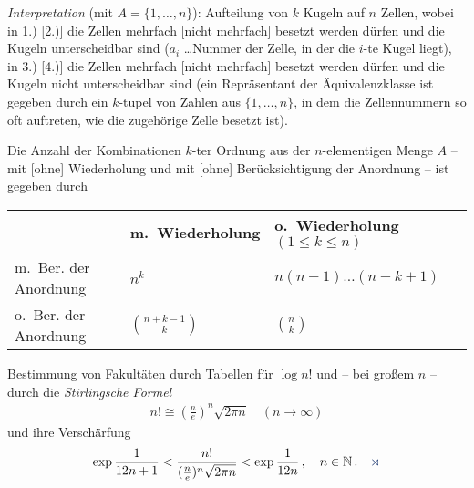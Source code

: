 \textit{Interpretation} (mit $A= \{1,\ldots ,n\}$): Aufteilung von $k$
Kugeln auf $n$ Zellen, wobei in 1.) [2.)] die Zellen mehrfach [nicht mehrfach]
besetzt werden dürfen und die Kugeln unterscheidbar sind ($a_{i}$ \ldots Nummer der Zelle, in
der die $i$-te Kugel liegt), in 3.) [4.)] die Zellen mehrfach [nicht mehrfach]
besetzt werden dürfen und die Kugeln nicht unterscheidbar sind (ein Repräsentant
der Äquivalenzklasse ist gegeben durch ein $k$-tupel von Zahlen aus
$\{1, \ldots , n\}$, in dem die Zellennummern so oft auftreten, wie die
zugehörige Zelle besetzt ist).\\

\begin{prop}
\label{prop:2.3}
Die Anzahl der Kombinationen $k$-ter Ordnung aus der
$n$-elementigen Menge $A$ -- mit [ohne] Wiederholung und mit [ohne]
Berücksichtigung der Anordnung -- ist gegeben durch

\vspace{0.2cm}
\begin{tabular}{l|l|l}
 & m.\ Wiederholung & o.\ Wiederholung $(1 \leq k \leq n )$ \\ \hline
 m.\ Ber. der Anordnung & $n^{k}$ & $n(n-1) \ldots (n-k+1)$ \\
 \hline
 o.\ Ber. der Anordnung & ${n+k-1 \choose k}$& ${n \choose k}$ \\
\hline
\end{tabular}

\vspace{0.5cm}
Bestimmung von Fakultäten durch Tabellen für $\log n!$  und -- bei großem $n$ --
durch die \emph{Stirlingsche Formel}
\begin{align*}
 n! \cong \left(\frac{n}{e}\right)^{n} \sqrt{2 \pi n } \quad (n \to \infty )
\end{align*}
und ihre Verschärfung
\begin{align*}
\exp \frac{1}{12 n+1}<{\displaystyle\frac{n!}{(\frac{n}{e})^{n}\sqrt{2\pi
n}}} < \exp \frac{1}{12 n}\, , \quad n \in \mathbb{N} \, .\fishhere
\end{align*}
\end{prop}
